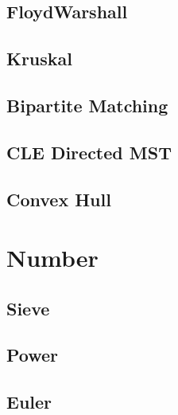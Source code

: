\subsection{FloydWarshall}


\subsection{Kruskal}


\subsection{Bipartite Matching}


\subsection{CLE Directed MST}


\subsection{Convex Hull}

\section{Number}

\subsection{Sieve}


\subsection{Power}


\subsection{Euler}

